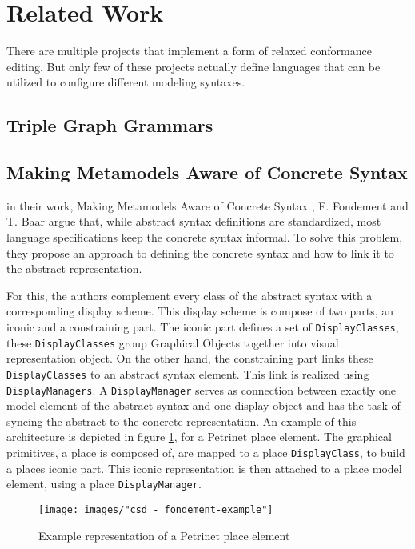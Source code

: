 \section{Related Work}
\label{section:related_work}

There are multiple projects that implement a form of relaxed conformance editing. But only few of these projects actually define languages that can be utilized to configure different modeling syntaxes. 




\subsection{Triple Graph Grammars}


\subsection{Making Metamodels Aware of Concrete Syntax}
\label{sec:fondement}
in their work, Making Metamodels Aware of Concrete Syntax \cite{fondement_making_2005}, F. Fondement and T. Baar argue that, while abstract syntax definitions are standardized, most language specifications keep the concrete syntax informal. To solve this problem, they propose an approach to defining the concrete syntax and how to link it to the abstract representation.

For this, the authors complement every class of the abstract syntax with a corresponding display scheme. This display scheme is compose of two parts, an iconic and a constraining part. The iconic part defines a set of \texttt{DisplayClasses}, these \texttt{DisplayClasses} group Graphical Objects together into visual representation object. On the other hand, the constraining part links these \texttt{DisplayClasses} to an abstract syntax element. This link is realized using \texttt{DisplayManagers}. A \texttt{DisplayManager} serves as connection between exactly one model element of the abstract syntax and one display object and has the task of syncing the abstract to the concrete representation. An example of this architecture is depicted in figure \ref{fig:fondement_dm}, for a Petrinet place element. The graphical primitives, a place is composed of, are mapped to a place \texttt{DisplayClass}, to build a places iconic part. This iconic representation is then attached to a place model element, using a place \texttt{DisplayManager}.


\begin{figure}[H]
  \centering
  \texttt{[image: images/"csd - fondement-example"]}
  \caption{Example representation of a Petrinet place element}
  \label{fig:fondement_dm}
\end{figure}

